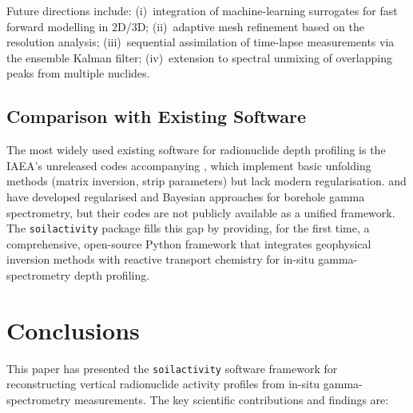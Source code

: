 \documentclass[a4paper,11pt]{article}
\begin{document}
Future directions include: (i)~integration of machine-learning
surrogates for fast forward modelling in 2D/3D; (ii)~adaptive mesh
refinement based on the resolution analysis; (iii)~sequential
assimilation of time-lapse measurements via the ensemble Kalman
filter; (iv)~extension to spectral unmixing of overlapping peaks
from multiple nuclides.

\subsection{Comparison with Existing Software}

The most widely used existing software for radionuclide depth profiling
is the IAEA's unreleased codes accompanying \citet{zombori1992new},
which implement basic unfolding methods (matrix inversion, strip
parameters) but lack modern regularisation.  \citet{tyler2008determination}
and \citet{hasan2022regularised,hasan2023bayesian} have developed
regularised and Bayesian approaches for borehole gamma spectrometry,
but their codes are not publicly available as a unified framework.  The
\texttt{soilactivity} package fills this gap by providing, for the first
time, a comprehensive, open-source Python framework that integrates
geophysical inversion methods with reactive transport chemistry for
in-situ gamma-spectrometry depth profiling.


\section{Conclusions}\label{sec:conclusions}

This paper has presented the \texttt{soilactivity} software framework
for reconstructing vertical radionuclide activity profiles from in-situ
gamma-spectrometry measurements.  The key scientific contributions and
findings are:
\end{document}
